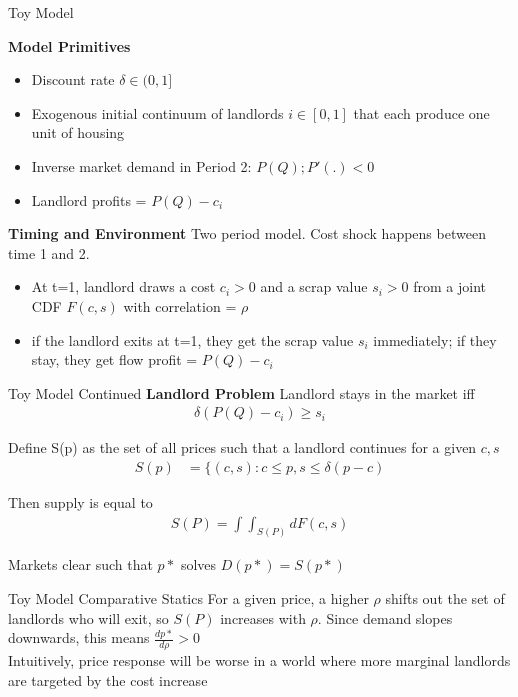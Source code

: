 \documentclass[10pt, xcolor=dvipsnames]{beamer}
\begin{document}
\begin{frame}{Toy Model}

\textbf{Model Primitives}
\begin{itemize}
    \item Discount rate $\delta \in (0,1]$
    \item Exogenous initial continuum of landlords $i \in [0,1]$ that each produce one unit of housing
    \item Inverse market demand in Period 2: $P(Q); P'(.) < 0$
    \item Landlord profits = $P(Q) - c_i$
\end{itemize}

\textbf{Timing and Environment}
Two period model. Cost shock happens between time 1 and 2.
\begin{itemize}
    \item At t=1, landlord draws a cost $c_i>0$ and a scrap value $s_i>0$ from a joint CDF $F(c,s)$ with correlation = $\rho$
    \item if the landlord exits at t=1, they get the scrap value $s_i$ immediately; if they stay, they get flow profit = $P(Q) - c_i$
\end{itemize}


\end{frame}

\begin{frame}{Toy Model Continued}
\textbf{Landlord Problem}
Landlord stays in the market iff
\begin{align*}
    \delta(P(Q) - c_i) \geq s_i
\end{align*}

Define S(p) as the set of all prices such that a landlord continues for a given $c,s$
\begin{align*}
    S(p) & = \big\{(c,s): c \leq p, s \leq \delta(p - c)
\end{align*}

Then supply is equal to 
\begin{align*}
    S(P) =  \int\int_{S(P)}dF(c,s)
\end{align*}

Markets clear such that $p*$ solves $D(p*) = S(p*)$


    
\end{frame}

\begin{frame}{Toy Model Comparative Statics}
For a given price, a higher $\rho$ shifts out the set of landlords who will exit, so $S(P)$ increases with $\rho$. Since demand slopes downwards, this means $\frac{dp*}{d\rho} >0$\\

Intuitively, price response will be worse in a world where more marginal landlords are targeted by the cost increase
    
\end{frame}
\end{document}
